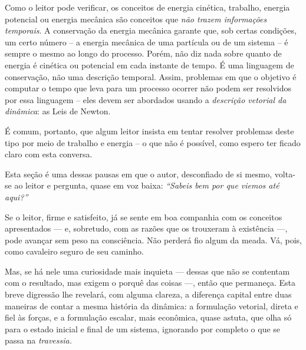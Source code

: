 \begin{enumerate}
Como o leitor pode verificar, os conceitos de energia cinética, trabalho, energia potencial ou energia mecânica são conceitos que \emph{não trazem informações temporais}. A conservação da energia mecânica garante que, sob certas condições, um certo número -- a energia mecânica de uma partícula ou de um sistema -- é sempre o mesmo ao longo do processo. Porém, não diz nada sobre quanto de energia é cinética ou potencial em cada instante de tempo. É uma linguagem de conservação, não uma descrição temporal. Assim, problemas em que o objetivo é computar o tempo que leva para um processo ocorrer não podem ser resolvidos por essa linguagem -- eles devem ser abordados usando a \emph{descrição vetorial da dinâmica}: as Leis de Newton.

É comum, portanto, que algum leitor insista em tentar resolver problemas deste tipo por meio de trabalho e energia -- o que não é possível, como espero ter ficado claro com esta conversa.


\end{enumerate}





Esta seção é uma dessas pausas em que o autor, desconfiado de si mesmo, volta-se ao leitor e pergunta, quase em voz baixa: \emph{“Sabeis bem por que viemos até aqui?”}

Se o leitor, firme e satisfeito, já se sente em boa companhia com os conceitos apresentados — e, sobretudo, com as razões que os trouxeram à existência —, pode avançar sem peso na consciência. Não perderá fio algum da meada. Vá, pois, como cavaleiro seguro de seu caminho.

Mas, se há nele uma curiosidade mais inquieta — dessas que não se contentam com o resultado, mas exigem o porquê das coisas —, então que permaneça. Esta breve digressão lhe revelará, com alguma clareza, a diferença capital entre duas maneiras de contar a mesma história da dinâmica: a formulação vetorial, direta e fiel às forças, e a formulação escalar, mais econômica, quase astuta, que olha só para o estado inicial e final de um sistema, ignorando por completo o que se passa na \emph{travessia.}

